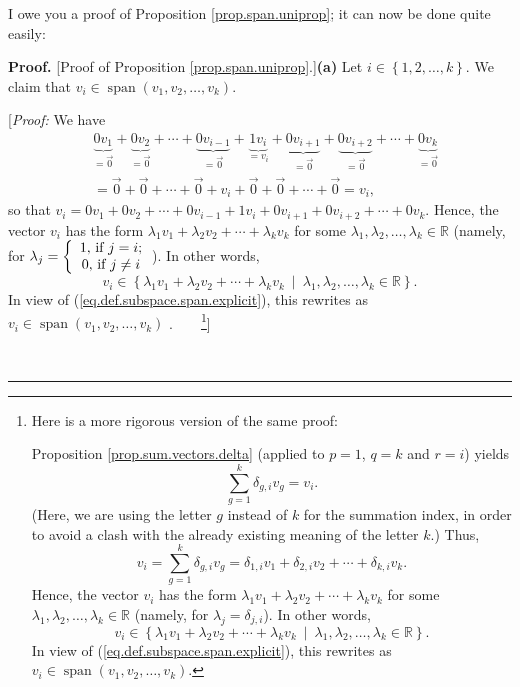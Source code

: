 \documentclass[numbers=enddot,12pt,final,onecolumn,notitlepage]{scrartcl}%
\theoremstyle{definition}
\newenvironment{proof}[1][Proof]{\noindent\textbf{#1.} }{\ \rule{0.5em}{0.5em}}
\let\sumnonlimits\sum
\renewcommand{\sum}{\sumnonlimits\limits}
\begin{document}
I owe you a proof of Proposition \ref{prop.span.uniprop}; it can now be done
quite easily:

\begin{proof}
[Proof of Proposition \ref{prop.span.uniprop}.]\textbf{(a)} Let $i\in\left\{
1,2,\ldots,k\right\}  $. We claim that $v_{i}\in\operatorname{span}\left(
v_{1},v_{2},\ldots,v_{k}\right)  $.

[\textit{Proof:} We have%
\begin{align*}
&  \underbrace{0v_{1}}_{=\overrightarrow{0}}+\underbrace{0v_{2}}%
_{=\overrightarrow{0}}+\cdots+\underbrace{0v_{i-1}}_{=\overrightarrow{0}%
}+\underbrace{1v_{i}}_{=v_{i}}+\underbrace{0v_{i+1}}_{=\overrightarrow{0}%
}+\underbrace{0v_{i+2}}_{=\overrightarrow{0}}+\cdots+\underbrace{0v_{k}%
}_{=\overrightarrow{0}}\\
&  =\overrightarrow{0}+\overrightarrow{0}+\cdots+\overrightarrow{0}%
+v_{i}+\overrightarrow{0}+\overrightarrow{0}+\cdots+\overrightarrow{0}=v_{i},
\end{align*}
so that $v_{i}=0v_{1}+0v_{2}+\cdots+0v_{i-1}+1v_{i}+0v_{i+1}+0v_{i+2}%
+\cdots+0v_{k}$. Hence, the vector $v_{i}$ has the form $\lambda_{1}%
v_{1}+\lambda_{2}v_{2}+\cdots+\lambda_{k}v_{k}$ for some $\lambda_{1}%
,\lambda_{2},\ldots,\lambda_{k}\in\mathbb{R}$ (namely, for $\lambda
_{j}=\left\{
\begin{array}
[c]{c}%
1\text{, if }j=i\text{;}\\
0\text{, if }j\neq i
\end{array}
\right.  $). In other words,
\[
v_{i}\in\left\{  \lambda_{1}v_{1}+\lambda_{2}v_{2}+\cdots+\lambda_{k}%
v_{k}\ \mid\ \lambda_{1},\lambda_{2},\ldots,\lambda_{k}\in\mathbb{R}\right\}
.
\]
In view of (\ref{eq.def.subspace.span.explicit}), this rewrites as $v_{i}%
\in\operatorname{span}\left(  v_{1},v_{2},\ldots,v_{k}\right)  $%
.\ \ \ \ \footnote{Here is a more rigorous version of the same proof:
\par
Proposition \ref{prop.sum.vectors.delta} (applied to $p=1$, $q=k$ and $r=i$)
yields%
\[
\sum_{g=1}^{k}\delta_{g,i}v_{g}=v_{i}.
\]
(Here, we are using the letter $g$ instead of $k$ for the summation index, in
order to avoid a clash with the already existing meaning of the letter $k$.)
Thus,%
\[
v_{i}=\sum_{g=1}^{k}\delta_{g,i}v_{g}=\delta_{1,i}v_{1}+\delta_{2,i}%
v_{2}+\cdots+\delta_{k,i}v_{k}.
\]
Hence, the vector $v_{i}$ has the form $\lambda_{1}v_{1}+\lambda_{2}%
v_{2}+\cdots+\lambda_{k}v_{k}$ for some $\lambda_{1},\lambda_{2}%
,\ldots,\lambda_{k}\in\mathbb{R}$ (namely, for $\lambda_{j}=\delta_{j,i}$). In
other words,
\[
v_{i}\in\left\{  \lambda_{1}v_{1}+\lambda_{2}v_{2}+\cdots+\lambda_{k}%
v_{k}\ \mid\ \lambda_{1},\lambda_{2},\ldots,\lambda_{k}\in\mathbb{R}\right\}
.
\]
In view of (\ref{eq.def.subspace.span.explicit}), this rewrites as $v_{i}%
\in\operatorname{span}\left(  v_{1},v_{2},\ldots,v_{k}\right)  $.}]


\end{proof}
\end{document}
